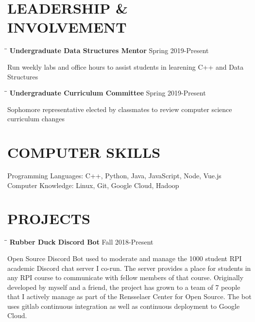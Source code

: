 \documentclass{res}
\begin{document}
\begin{resume}
\section{LEADERSHIP \& INVOLVEMENT} 
	\vspace{-0.1in}	         
	\begin{tabbing}
   \hspace{2.3in}\= \hspace{3.4in}\= \kill
    {\bf Undergraduate Data Structures Mentor} \>  \>Spring 2019-Present
   \end{tabbing}\vspace{-20pt} 
	Run weekly labs and office hours to assist students in learening C++ and Data Structures
    \vspace{-15pt} 
    \begin{tabbing}
   \hspace{2.3in}\= \hspace{3.4in}\= \kill
    {\bf Undergraduate Curriculum Committee} \>  \>Spring 2019-Present
   \end{tabbing}\vspace{-20pt} 
	Sophomore representative elected by classmates to review computer science curriculum changes
    
    


\section{COMPUTER SKILLS}          
    Programming Languages: C++, Python, Java, JavaScript, Node, Vue.js\\
    Computer Knowledge: Linux, Git, Google Cloud, Hadoop       
 
 
\section{PROJECTS} 
	\vspace{-0.1in}	         
	\begin{tabbing}
   \hspace{2.3in}\= \hspace{3.4in}\= \kill
    {\bf Rubber Duck Discord Bot} \>  \>Fall 2018-Present
   \end{tabbing}\vspace{-20pt} 
	Open Source Discord Bot used to moderate and manage the 1000 student RPI academic Discord chat server I co-run. The server provides a place for students in any RPI course to communicate with fellow members of that course. Originally developed by myself and a friend, the project has grown to a team of 7 people that I actively manage as part of the Rensselaer Center for Open Source. The bot uses gitlab continuous integration as well as continuous deployment to Google Cloud.
    
          
 
\end{resume}
\end{document}
